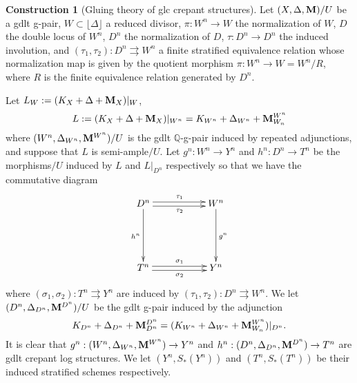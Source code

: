 \documentclass[11pt]{amsart}
\numberwithin{equation}{section}
\newcommand{\Mm}{{\bf{M}}}
\newcommand{\lf}{\lfloor}
\newcommand{\rf}{\rfloor}
\theoremstyle{definition}
\theoremstyle{definition}
\newtheorem{cons}[thm]{Construction}
\theoremstyle{definition}
\begin{document}
\begin{cons}[Gluing theory of glc crepant structures]\label{cons: gluing part 1}
Let $(X,\Delta,\Mm)/U$ be a gdlt g-pair, $W\subset\lf\Delta\rf$ a reduced divisor, $\pi: W^n\rightarrow W$ the normalization of $W$, $D$ the double locus of $W^n$, $D^n$ the normalization of $D$, $\tau: D^n\rightarrow D^n$ the induced involution, and $(\tau_1,\tau_2): D^n\rightrightarrows W^n$ a finite stratified equivalence relation whose normalization map is given by the quotient morphism $\pi: W^n\to W=W^n/R$, where $R$ is the finite equivalence relation generated by $D^n$. 

Let $L_W:=(K_X+\Delta+\Mm_X)|_W$, $$L:=(K_X+\Delta+\Mm_X)|_{W^n}=K_{W^n}+\Delta_{W^n}+\Mm^{W^n}_{W_n}$$
where $(W^n,\Delta_{W^n},\Mm^{W^n})/U$ is the gdlt $\mathbb Q$-g-pair induced by repeated adjunctions, and suppose that $L$ is semi-ample$/U$. Let $g^n: W^n\rightarrow Y^n$ and $h^n: D^n\rightarrow T^n$ be the morphisms$/U$ induced by $L$ and $L|_{D^n}$ respectively so that we have the commutative diagram
\begin{displaymath}
    \xymatrix{ 
        D^n \ar[dd]_{h^n}\ar@<.5ex>[rr]^{\tau_1} \ar@<-.5ex>[rr]_{\tau_2} && W^n \ar[dd]^{g^n} \\
        &&\\
        T^n \ar@<.5ex>[rr]^{\sigma_1}\ar@<-.5ex>[rr]_{\sigma_2} && Y^n 
    }
\end{displaymath}
where $(\sigma_1,\sigma_2): T^n\rightrightarrows Y^n$ are induced by $(\tau_1,\tau_2): D^n\rightrightarrows W^n$. We let $(D^n,\Delta_{D^n},\Mm^{D^n})/U$ be the gdlt g-pair induced by the adjunction
$$
K_{D^n}+\Delta_{D^n}+\Mm^{D^n}_{D^n}=(K_{W^n}+\Delta_{W^n}+\Mm^{W^n}_{W_n})|_{D^n}.
$$
It is clear that $g^n:(W^n,\Delta_{W^n},\Mm^{W^n})\to Y^n$ and  $h^n: (D^n,\Delta_{D^n},\Mm^{D^n})\rightarrow T^n$ are gdlt crepant log structures. We let $(Y^n,S_*(Y^n))$ and $(T^n,S_*(T^n))$ be their induced stratified schemes respectively.
\end{cons}
\end{document}
